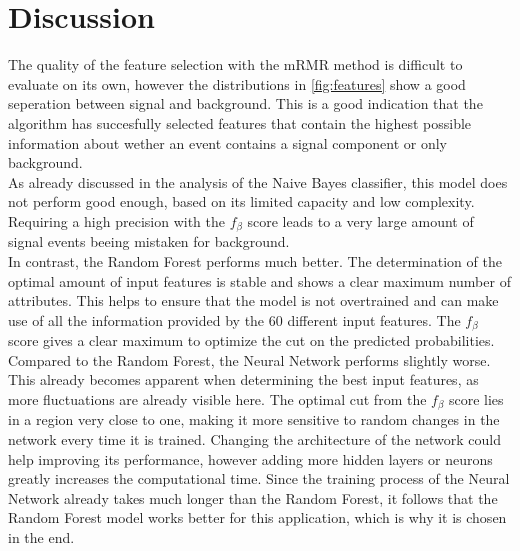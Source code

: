 \section{Discussion}
\label{sec:Discussion}

The quality of the feature selection with the mRMR method is difficult
to evaluate on its own, however the distributions in \autoref{fig:features}
show a good seperation between signal and background. This is a good indication
that the algorithm has succesfully selected features that contain the highest
possible information about wether an event contains a signal component or only
background. \\
As already discussed in the analysis of the Naive Bayes classifier, this
model does not perform good enough, based on its limited capacity and low
complexity. Requiring a high precision with the $f_\beta$ score leads to a very
large amount of signal events beeing mistaken for background. \\
In contrast, the Random Forest performs much better. The determination of
the optimal amount of input features is stable and shows a clear maximum
number of attributes. This helps to ensure that the model is not overtrained
and can make use of all the information provided by the $60$ different input
features. The $f_\beta$ score gives a clear maximum to optimize the cut on the
predicted probabilities. \\
Compared to the Random Forest, the Neural Network performs slightly worse.
This already becomes apparent when determining the best input features, as more
fluctuations are already visible here. The optimal cut from the $f_\beta$ score
lies in a region very close to one, making it more sensitive to random changes in the
network every time it is trained. Changing the architecture of the network could
help improving its performance, however adding more hidden layers or neurons greatly
increases the computational time. Since the training process of the Neural Network
already takes much longer than the Random Forest, it follows that the Random Forest
model works better for this application, which is why it is chosen in the end.

